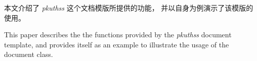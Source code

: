 %

\begin{cabstract}

	本文介绍了 \emph{pkuthss} 这个文档模版所提供的功能，
	并以自身为例演示了该模版的使用。

\end{cabstract}

\begin{eabstract}

	This paper describes the the functions provided by
	the \emph{pkuthss} document template,
	and provides itself as an example to illustrate
	the usage of the document class.

\end{eabstract}

